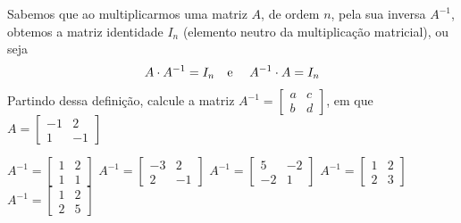 Sabemos que ao multiplicarmos uma matriz $A$, de ordem $n$, pela sua inversa $A^{-1}$, obtemos a matriz identidade $I_n$ (elemento neutro da multiplicação matricial), ou seja
\[A\cdot A^{-1}=I_n\textnormal{\quad e \quad}A^{-1}\cdot A=I_n \]
Partindo dessa definição, calcule a matriz $A^{-1}=\left[ \begin{array}{cc}
a   &  c \\
b   &  d
\end{array} \right]$, em que $A = \left[ \begin{array}{cc}
-1 &    2\\
1   & -1
\end{array} \right]$

$A^{-1} = \left[ \begin{array}{cc} 1   &  2\\ 1  &   1 \end{array} \right]$
$A^{-1} = \left[ \begin{array}{cc} -3  &  2\\ 2  & -1 \end{array} \right]$
$A^{-1} = \left[ \begin{array}{cc} 5  & -2\\ -2  &  1 \end{array} \right]$
$A^{-1} = \left[ \begin{array}{cc} 1  &  2\\ 2  &  3 \end{array} \right]$
$A^{-1} = \left[ \begin{array}{cc} 1   &  2\\ 2  &   5 \end{array} \right]$


